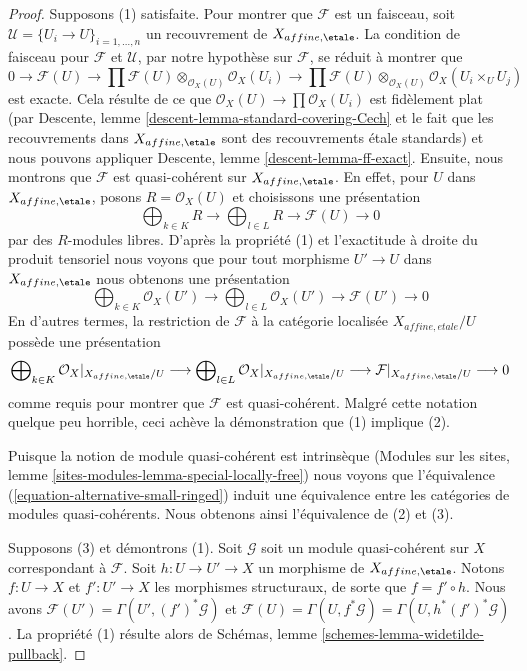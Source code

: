 \begin{proof}
Supposons (1) satisfaite. Pour montrer que $\mathcal{F}$ est un faisceau, soit
$\mathcal{U} = \{U_i \to U\}_{i = 1, \ldots, n}$ un recouvrement
de $X_{affine, \etale}$. La condition de faisceau pour $\mathcal{F}$
et $\mathcal{U}$, par notre hypothèse sur $\mathcal{F}$,
se réduit à montrer que
$$
0 \to \mathcal{F}(U) \to
\prod \mathcal{F}(U) \otimes_{\mathcal{O}_X(U)} \mathcal{O}_X(U_i) \to
\prod \mathcal{F}(U) \otimes_{\mathcal{O}_X(U)} \mathcal{O}_X(U_i \times_U U_j)
$$
est exacte. Cela résulte de ce que $\mathcal{O}_X(U) \to \prod \mathcal{O}_X(U_i)$
est fidèlement plat
(par Descente, lemme \ref{descent-lemma-standard-covering-Cech} et
le fait que les recouvrements dans $X_{affine, \etale}$ sont des recouvrements \'etale
standards) et nous pouvons appliquer Descente, lemme \ref{descent-lemma-ff-exact}.
Ensuite, nous montrons que $\mathcal{F}$ est quasi-cohérent sur $X_{affine, \etale}$.
En effet, pour $U$ dans $X_{affine, \etale}$, posons $R = \mathcal{O}_X(U)$
et choisissons une présentation
$$
\bigoplus\nolimits_{k \in K} R
\longrightarrow
\bigoplus\nolimits_{l \in L} R
\longrightarrow
\mathcal{F}(U)
\longrightarrow 0
$$
par des $R$-modules libres. D'après la propriété (1) et l'exactitude à droite du produit tensoriel
nous voyons que pour tout morphisme $U' \to U$ dans $X_{affine, \etale}$
nous obtenons une présentation
$$
\bigoplus\nolimits_{k \in K} \mathcal{O}_X(U')
\longrightarrow
\bigoplus\nolimits_{l \in L} \mathcal{O}_X(U')
\longrightarrow
\mathcal{F}(U')
\longrightarrow 0
$$
En d'autres termes, la restriction de $\mathcal{F}$
à la catégorie localisée $X_{affine, etale}/U$ possède une présentation
$$
\bigoplus\nolimits_{k \in K} \mathcal{O}_X|_{X_{affine, \etale}/U}
\longrightarrow
\bigoplus\nolimits_{l \in L} \mathcal{O}_X|_{X_{affine, \etale}/U}
\longrightarrow
\mathcal{F}|_{X_{affine, \etale}/U}
\longrightarrow 0
$$
comme requis pour montrer que $\mathcal{F}$ est quasi-cohérent.
Malgré cette notation quelque peu horrible, ceci achève la démonstration
que (1) implique (2).

\medskip\noindent
Puisque la notion de module quasi-cohérent est intrinsèque
(Modules sur les sites, lemme \ref{sites-modules-lemma-special-locally-free})
nous voyons que l'équivalence (\ref{equation-alternative-small-ringed})
induit une équivalence entre les catégories de modules quasi-cohérents.
Nous obtenons ainsi l'équivalence de (2) et (3).

\medskip\noindent
Supposons (3) et démontrons (1). Soit
$\mathcal{G}$ soit un module quasi-cohérent sur $X$ correspondant à $\mathcal{F}$.
Soit $h : U \to U' \to X$ un morphisme de $X_{affine, \etale}$.
Notons $f : U \to X$ et $f' : U' \to X$ les morphismes structuraux,
de sorte que $f = f' \circ h$. Nous avons
$\mathcal{F}(U') = \Gamma(U', (f')^*\mathcal{G})$ et
$\mathcal{F}(U) = \Gamma(U, f^*\mathcal{G}) = \Gamma(U, h^*(f')^*\mathcal{G})$.
La propriété (1) résulte alors de Schémas, lemme \ref{schemes-lemma-widetilde-pullback}.
\end{proof}





